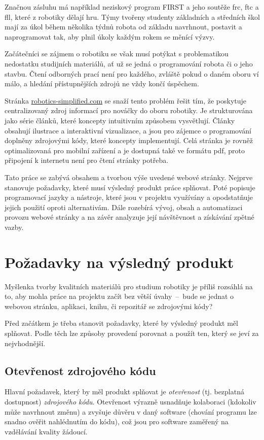 \documentclass[a4paper, 12pt, twoside]{article}
\begin{document}
  Značnou zásluhu má například neziskový program FIRST a jeho soutěže \gls{frc}, \gls{ftc} a \gls{fll}, které z robotiky dělají hru. Týmy tvořeny studenty základních a středních škol mají za úkol během několika týdnů robota od základu navrhnout, postavit a naprogramovat tak, aby plnil úkoly každým rokem se měnící výzvy.

  Začátečníci se zájmem o robotiku se však musí potýkat s problematikou nedostatku studijních materiálů, ať už se jedná o programování robota či o jeho stavbu. Čtení odborných prací není pro každého, zvláště pokud o daném oboru ví málo, a hledání přístupnějších zdrojů ne vždy končí úspěchem.

  Stránka \url{robotics-simplified.com} se snaží tento problém řešit tím, že poskytuje centralizovaný zdroj informací pro nováčky do oboru robotiky. Je strukturována jako série článků, které koncepty intuitivním způsobem vysvětlují. Články obsahují ilustrace a interaktivní vizualizace, a jsou pro zájemce o programování doplněny zdrojovými kódy, které koncepty implementují. Celá stránka je rovněž optimalizovaná pro mobilní zařízení a je dostupná také ve formátu \gls{pdf}, proto připojení k internetu není pro čtení stránky potřeba.

  Tato práce se zabývá obsahem a tvorbou výše uvedené webové stránky. Nejprve stanovuje požadavky, které musí výsledný produkt práce splňovat. Poté popisuje programovací jazyky a nástroje, které jsou v projektu využívány a opodstatňuje jejich použití oproti alternativám. Dále rozebírá vývoj, obsah a automatizaci provozu webové stránky a na závěr analyzuje její návštěvnost a získávání zpětné vazby.

  \newpage

  \section{Požadavky na výsledný produkt} \label{sec:Požadavky na výsledný produkt}
  Myšlenka tvorby kvalitních materiálů pro studium robotiky je příliš rozsáhlá na to, aby mohla práce na projektu začít bez větší úvahy~--~bude se jednat o webovou stránku, aplikaci, knihu, či repozitář se zdrojovými kódy?

  Před začátkem je třeba stanovit požadavky, které by výsledný produkt měl splňovat. Podle těch lze způsoby provedení porovnat a použít ten, který se jeví za nejvhodnější.


  \subsection{Otevřenost zdrojového kódu}
  Hlavní požadavek, který by měl produkt splňovat je \emph{otevřenost} (tj. bezplatná dostupnost) \emph{zdrojového kódu}. Otevřenost výrazně usnadňuje kolaboraci (kdokoliv může navrhnout změnu) a zvyšuje důvěru v daný software (chování programu lze snadno ověřit nahlédnutím do kódu), což jsou pro software zaměřený na vzdělávání kvality žádoucí.
\end{document}
